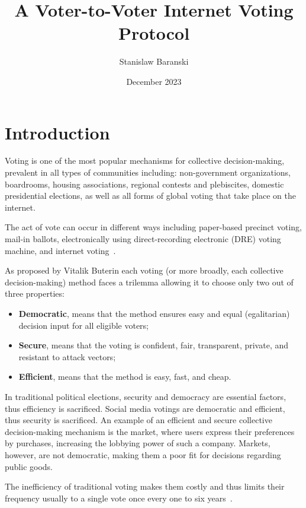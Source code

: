 \documentclass{article}
\title{A Voter-to-Voter Internet Voting Protocol}
\author{Stanislaw Baranski}
\date{December 2023}
\begin{document}
\maketitle


\section{Introduction}
Voting is one of the most popular mechanisms for collective decision-making, prevalent in all types of communities including: non-government organizations, boardrooms, housing associations, regional contests and plebiscites, domestic presidential elections, as well as all forms of global voting that take place on the internet.

The act of vote can occur in different ways including paper-based precinct voting, mail-in ballots, electronically using direct-recording electronic (DRE) voting machine, and internet voting~\cite{parkGoingBadWorse2021}.

As proposed by Vitalik Buterin\cite{buterinBlockchainVotingOverrated2021} each voting (or more broadly, each collective decision-making) method faces a trilemma allowing it to choose only two out of three properties:

\begin{itemize}
    \item \textbf{Democratic}, means that the method ensures easy and equal (egalitarian) decision input for all eligible voters;
    \item \textbf{Secure}, means that the voting is confident, fair, transparent, private, and resistant to attack vectors;
    \item \textbf{Efficient}, means that the method is easy, fast, and cheap.
\end{itemize}

In traditional political elections, security and democracy are essential factors, thus efficiency is sacrificed. Social media votings are democratic and efficient, thus security is sacrificed. An example of an efficient and secure collective decision-making mechanism is the market, where users express their preferences by purchases, increasing the lobbying power of such a company. Markets, however, are not democratic, making them a poor fit for decisions regarding public goods. 

The inefficiency of traditional voting makes them costly and thus limits their frequency usually to a single vote once every one to six years~\cite{buterinBlockchainVotingOverrated2021}.
\end{document}
